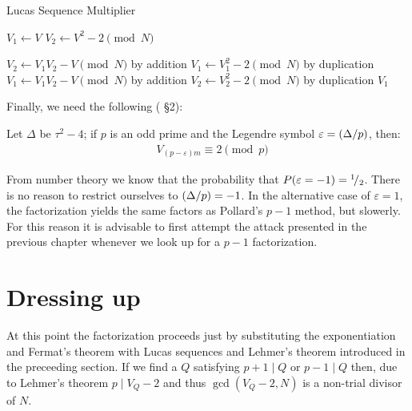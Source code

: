 \begin{algorithm}[H]
  \caption{Lucas Sequence Multiplier}
  \begin{algorithmic}[1]
      \State $V_1 \gets V$
      \State $V_2 \gets V^2 - 2 \pmod{N}$

          \State $V_2 \gets V_1V_2 - V \pmod{N}$
          \Comment by addition %
          \State $V_1 \gets V_1^2 -2 \pmod{N}$
          \Comment by duplication %
          \State $V_1 \gets V_1V_2 - V \pmod{N}$
          \Comment by addition %
          \State $V_2 \gets V_2^2 -2 \pmod{N}$
          \Comment by duplication %
        \EndIf
      \EndFor
      \State \Return $V_1$
    \EndFunction
  \end{algorithmic}
\end{algorithm}

Finally, we need the following (\cite{Williams:p+1} \S 2):
\begin{theorem*}[Lehmer]
  Let $\Delta$ be $\tau^2-4$;
  if $p$ is an odd prime and the Legendre symbol
  $\varepsilon = ({\Delta}/{p})$, then:
  \begin{align*}
  &  V_{(p - \varepsilon)m} \equiv 2 \pmod{p}
  \end{align*}
\end{theorem*}



\begin{remark}
  From number theory we know that the probability that
  $P(\varepsilon = -1) = {}^{1}\!/_{2}$.
  There is no reason to restrict ourselves to
  $({\Delta}/{p}) = -1$.
  In the alternative case of $\varepsilon = 1$, the factorization yields the
  same factors as Pollard's $p-1$ method, but slowerly.
  For this reason it is advisable to first attempt the attack presented in the
  previous chapter \cite{Williams:p+1}whenever we look up for a $p-1$
  factorization.
\end{remark}


\section{Dressing up}

At this point the factorization proceeds just by substituting the
exponentiation and Fermat's theorem with Lucas sequences and Lehmer's theorem
introduced in the preceeding section. If we find a $Q$ satisfying $p+1 \mid Q
\text{ or } p-1 \mid Q$ then, due to Lehmer's theorem $p \mid V_Q -2$ and thus
$\gcd(V_Q -2, N)$ is a non-trial divisor of $N$.

